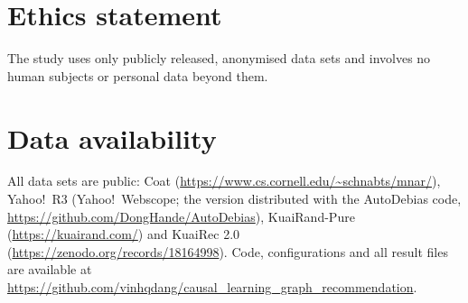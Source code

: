 \documentclass[12pt]{article}
\begin{document}
\section*{Ethics statement}
The study uses only publicly released, anonymised data sets and involves no human
subjects or personal data beyond them.

\section*{Data availability}
All data sets are public: Coat (\url{https://www.cs.cornell.edu/~schnabts/mnar/}),
Yahoo!\ R3 (Yahoo!\ Webscope; the version distributed with the AutoDebias code,
\url{https://github.com/DongHande/AutoDebias}), KuaiRand-Pure
(\url{https://kuairand.com/}) and KuaiRec 2.0
(\url{https://zenodo.org/records/18164998}). Code, configurations and all result
files are available at
\url{https://github.com/vinhqdang/causal_learning_graph_recommendation}.
\end{document}
